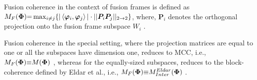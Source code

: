 Fusion coherence in the context of fusion frames is defined as $M_F(\boldsymbol{\Phi}) {=} \max_{i \neq j} \{ |\left\langle \boldsymbol{\varphi}_i , \boldsymbol{\varphi}_{j} \right\rangle | \cdot ||\boldsymbol{P}_i \boldsymbol{P}_j||_{2 {\to} 2}\}$, where, $\boldsymbol{P}_i$ denotes the orthogonal projection onto the fusion frame subspace $W_i$ \cite{Boufounos2011,Ayaz2014,Ayaz2016}.

Fusion coherence in the special setting, where the projection matrices are equal to one or all the subspaces have dimension one, reduces to MCC, i.e., $M_F(\boldsymbol{\Phi}) {\equiv} M(\boldsymbol{\Phi})$ \cite{Boufounos2011}, whereas for the equally-sized subspaces, reduces to the block-coherence defined by Eldar et al., i.e., $M_F(\boldsymbol{\Phi}) {\equiv} M^{Eldar}_{Inter}(\boldsymbol{\Phi})$ \cite{Boufounos2011}.